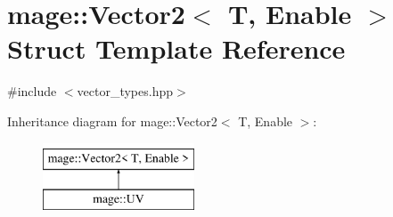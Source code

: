 \hypertarget{structmage_1_1_vector2}{}\section{mage\+:\+:Vector2$<$ T, Enable $>$ Struct Template Reference}
\label{structmage_1_1_vector2}


{\ttfamily \#include $<$vector\+\_\+types.\+hpp$>$}

Inheritance diagram for mage\+:\+:Vector2$<$ T, Enable $>$\+:\begin{figure}[H]
\begin{center}
\leavevmode
\includegraphics[height=2.000000cm]{structmage_1_1_vector2}
\end{center}
\end{figure}

